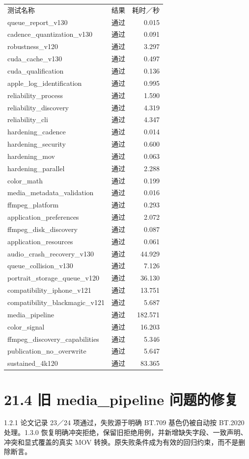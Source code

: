 \documentclass[UTF8,zihao=-4,openany]{ctexbook}
\begin{document}
\begin{longtable}{p{.60\linewidth}rr}\toprule
测试名称 & 结果 & 耗时／秒\\
queue\_report\_v130 & 通过 & 0.015\\
cadence\_quantization\_v130 & 通过 & 0.091\\
robustness\_v120 & 通过 & 3.297\\
cuda\_cache\_v130 & 通过 & 0.497\\
cuda\_qualification & 通过 & 0.136\\
apple\_log\_identification & 通过 & 0.995\\
reliability\_process & 通过 & 1.590\\
reliability\_discovery & 通过 & 4.319\\
reliability\_cli & 通过 & 4.347\\
hardening\_cadence & 通过 & 0.014\\
hardening\_security & 通过 & 0.600\\
hardening\_mov & 通过 & 0.063\\
hardening\_parallel & 通过 & 2.288\\
color\_math & 通过 & 0.199\\
media\_metadata\_validation & 通过 & 0.016\\
ffmpeg\_platform & 通过 & 0.293\\
application\_preferences & 通过 & 2.072\\
ffmpeg\_disk\_discovery & 通过 & 0.087\\
application\_resources & 通过 & 0.061\\
audio\_crash\_recovery\_v130 & 通过 & 44.929\\
queue\_collision\_v130 & 通过 & 7.126\\
portrait\_storage\_queue\_v120 & 通过 & 36.130\\
compatibility\_iphone\_v121 & 通过 & 13.751\\
compatibility\_blackmagic\_v121 & 通过 & 5.687\\
media\_pipeline & 通过 & 182.571\\
color\_signal & 通过 & 16.203\\
ffmpeg\_discovery\_capabilities & 通过 & 5.346\\
publication\_no\_overwrite & 通过 & 5.647\\
sustained\_4k120 & 通过 & 83.365\\\bottomrule\end{longtable}

\section*{21.4 旧 media\_pipeline 问题的修复}
1.2.1 论文记录 23／24 项通过，失败源于明确 BT.709 基色仍被自动按 BT.2020 处理。1.3.0 恢复明确冲突拒绝，保留旧拒绝用例，并新增缺失字段、一致声明、冲突和显式覆盖的真实 MOV 转换。原失败条件成为有效的回归约束，而不是删除断言。
\end{document}
